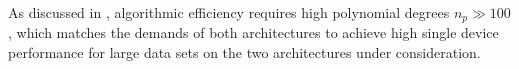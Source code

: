 \documentclass[letterpaper]{llncs}
\begin{document}
As discussed in , algorithmic efficiency requires
high polynomial degrees $n_p\gg 100$, which matches the demands of
both architectures to achieve high single device performance for large
data sets on the two architectures under consideration.
\end{document}
